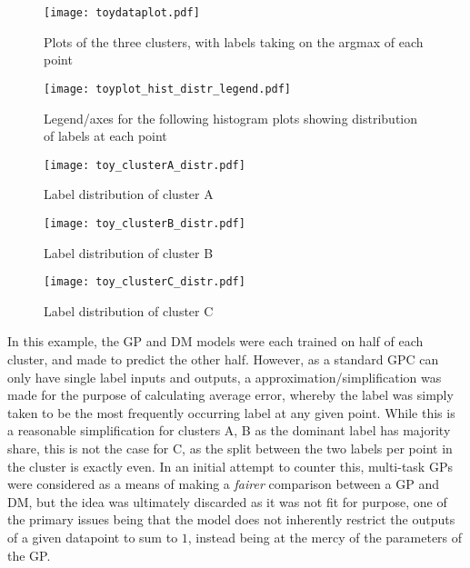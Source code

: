 
\begin{figure}[H]
    \texttt{[image: toydataplot.pdf]}
    \caption{Plots of the three clusters, with labels taking on the argmax of each point}
    \label{fig:toyplot}
\end{figure}

\begin{figure}[H]
    \texttt{[image: toyplot\_hist\_distr\_legend.pdf]}
    \caption{Legend/axes for the following histogram plots showing distribution of labels at each point}
    \label{fig:toyplothist_legend}
\end{figure}

\begin{figure}[H]
    \begin{minipage}{.49\linewidth}
        \texttt{[image: toy\_clusterA\_distr.pdf]}
        \caption{Label distribution of cluster A}
        \label{fig:toyclusterA}
    \end{minipage}
    \hfill
    \begin{minipage}{.49\linewidth}
        \texttt{[image: toy\_clusterB\_distr.pdf]}
        \caption{Label distribution of cluster B}
        \label{fig:toyclusterB}
    \end{minipage}
    \begin{minipage}{.49\linewidth}
        \texttt{[image: toy\_clusterC\_distr.pdf]}
        \caption{Label distribution of cluster C}
        \label{fig:toyclusterC}
    \end{minipage}
\end{figure}

In this example, the GP and DM models were each trained on half of each cluster, and made to predict the other half. However, as a standard GPC can only have single label inputs and outputs, a approximation/simplification was made for the purpose of calculating average error, whereby the label was simply taken to be the most frequently occurring label at any given point. While this is a reasonable simplification for clusters A, B as the dominant label has majority share, this is not the case for C, as the split between the two labels per point in the cluster is exactly even. In an initial attempt to counter this, multi-task GPs were considered as a means of making a \textit{fairer} comparison between a GP and DM, but the idea was ultimately discarded as it was not fit for purpose, one of the primary issues being that the model does not inherently restrict the outputs of a given datapoint to sum to $1$, instead being at the mercy of the parameters of the GP. 

